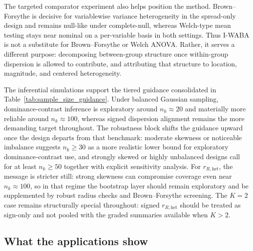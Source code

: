 \documentclass[preprint, times, 12pt, authoryear]{elsarticle}
\begin{document}
The targeted comparator experiment also helps position the method. Brown--Forsythe is decisive for variablewise variance heterogeneity in the spread-only design and remains null-like under complete-null, whereas Welch-type mean testing stays near nominal on a per-variable basis in both settings. Thus I-WABA is not a substitute for Brown--Forsythe or Welch ANOVA. Rather, it serves a different purpose: decomposing between-group structure once within-group dispersion is allowed to contribute, and attributing that structure to location, magnitude, and centered heterogeneity.

The inferential simulations support the tiered guidance consolidated in Table~\ref{tab:sample_size_guidance}. Under balanced Gaussian sampling, dominance-contrast inference is exploratory around $n_k\approx 20$ and materially more reliable around $n_k\approx 100$, whereas signed dispersion alignment remains the more demanding target throughout. The robustness block shifts the guidance upward once the design departs from that benchmark: moderate skewness or noticeable imbalance suggests $n_k\ge 30$ as a more realistic lower bound for exploratory dominance-contrast use, and strongly skewed or highly unbalanced designs call for at least $n_k\ge 50$ together with explicit sensitivity analysis. For $r_{R,\mathrm{het}}$, the message is stricter still: strong skewness can compromise coverage even near $n_k\approx 100$, so in that regime the bootstrap layer should remain exploratory and be supplemented by robust radius checks and Brown--Forsythe screening. The $K=2$ case remains structurally special throughout: signed $r_{R,\mathrm{het}}$ should be treated as sign-only and not pooled with the graded summaries available when $K>2$.

\subsection{What the applications show}
\end{document}
